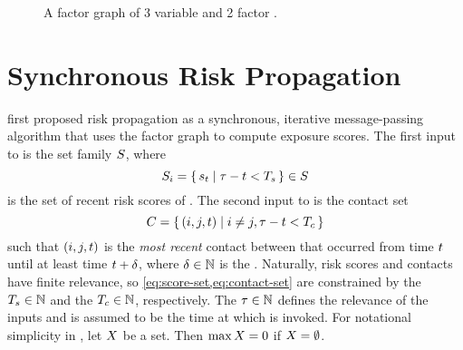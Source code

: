 \begin{figure}[htbp]
\centering
{}
\caption[Factor graph]{A factor graph of 3 variable \verticesName and 2 factor \verticesName.}
\label{fig:factor-graph}
\end{figure}

\section{Synchronous Risk Propagation}\label{sec:synchronous}

\citet{Ayday2021} first proposed risk propagation as a synchronous, iterative message-passing algorithm that uses the factor graph to compute exposure scores. The first input to \cRiskPropagation is the set family $S$, where
\begin{equation} \label{eq:score-set}
  S_i =\set{ s_t | \tau- t< T_s} \in S
\end{equation}
is the set of recent risk scores of . The second input to \cRiskPropagation is the contact set
\begin{equation} \label{eq:contact-set}
  C = \set{ (i, j, t) | i \neq j, \tau- t< T_c}
\end{equation}
such that $(i, j, t)$ is the \emph{most recent} contact between  that occurred from time $t$ until at least time $t + \delta$, where $\delta \in \mathbb{N}$ is the . Naturally, risk scores and contacts have finite relevance, so \cref{eq:score-set,eq:contact-set} are constrained by the  $T_s \in \mathbb{N}$ and the  $T_c \in \mathbb{N}$, respectively. The  $\tau \in \mathbb{N}$ defines the relevance of the inputs and is assumed to be the time at which \cRiskPropagation is invoked. For notational simplicity in \cRiskPropagation, let $X$ be a set. Then $\max X = 0$ if $X = \emptyset$.


